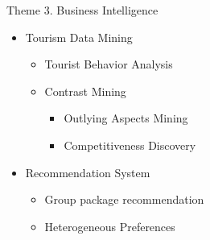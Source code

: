 \begin{slide}{Theme 3. Business Intelligence}
	
	\begin{itemize}
		\item Tourism Data Mining
		
		\begin{itemize}
			\item Tourist Behavior Analysis
			
			\item Contrast Mining
			
			\begin{itemize}
				
				\item Outlying Aspects Mining
				
				\item Competitiveness Discovery
				
			\end{itemize}
			
		\end{itemize}
		
		\item Recommendation System
		\begin{itemize}
			\item Group package recommendation
			\item Heterogeneous Preferences
		\end{itemize}
		
	\end{itemize}
	
\end{slide}



